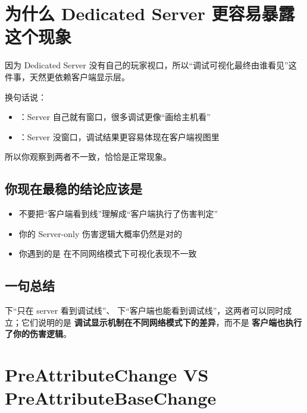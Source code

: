 \section{为什么 Dedicated Server 更容易暴露这个现象}

因为 Dedicated Server 没有自己的玩家视口，所以“调试可视化最终由谁看见”这件事，天然更依赖客户端显示层。

换句话说：

\begin{itemize}
	\item {}：Server 自己就有窗口，很多调试更像“画给主机看”
	\item {}：Server 没窗口，调试结果更容易体现在客户端视图里
\end{itemize}

所以你观察到两者不一致，恰恰是正常现象。

\subsection{你现在最稳的结论应该是}

\begin{itemize}
	\item 不要把“客户端看到线”理解成“客户端执行了伤害判定”
	\item 你的 Server-only 伤害逻辑大概率仍然是对的
	\item 你遇到的是  在不同网络模式下可视化表现不一致
\end{itemize}

\subsection{一句总结}

 下“只在 server 看到调试线”、 下“客户端也能看到调试线”，这两者可以同时成立；它们说明的是 \textbf{调试显示机制在不同网络模式下的差异}，而不是 \textbf{客户端也执行了你的伤害逻辑}。

\section{PreAttributeChange VS PreAttributeBaseChange}

